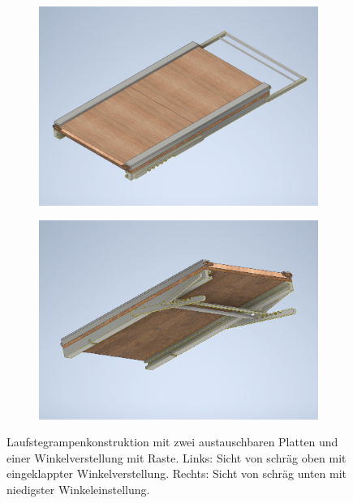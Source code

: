 \begin{figure}[tb]
	\hfill
	\begin{subfigure}[c]{.49\linewidth}
		\centering
		\includegraphics[width=\linewidth]{Bilder/Rampe_oben.png}
	\end{subfigure}
	\begin{subfigure}[c]{.49\linewidth}
		\centering
		\includegraphics[width=\linewidth]{Bilder/Rampe_unten.png}
	\end{subfigure}
	\hfill
	\caption{Laufstegrampenkonstruktion mit zwei austauschbaren Platten und einer Winkelverstellung mit Raste. Links: Sicht von schräg oben mit eingeklappter Winkelverstellung. Rechts: Sicht von schräg unten mit niedigster Winkeleinstellung.}
	\label{Rampe_Inventor}
\end{figure}
